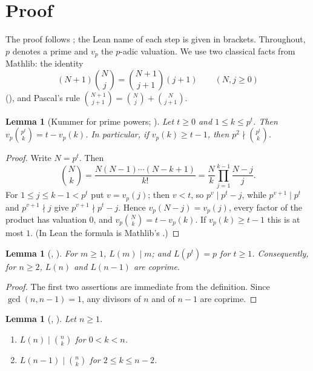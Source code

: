 \documentclass[11pt]{amsart}
\theoremstyle{plain}
\newtheorem{lemma}[theorem]{Lemma}
\theoremstyle{definition}
\begin{document}
\section{Proof}\label{sec:proof}

The proof follows ; the Lean name of each step is given in brackets. Throughout, $p$ denotes a prime and $v_p$ the $p$-adic valuation. We use two classical facts from Mathlib: the identity
\begin{equation}\label{eq:absorb}
  (N+1)\binom Nj=\binom{N+1}{j+1}(j+1)\qquad(N,j\ge0)
\end{equation}
(), and Pascal's rule $\binom{N+1}{j+1}=\binom Nj+\binom N{j+1}$.

\begin{lemma}[Kummer for prime powers; ]\label{lem:kummer}
Let $t\ge0$ and $1\le k\le p^t$. Then $v_p\binom{p^t}{k}=t-v_p(k)$. In particular, if $v_p(k)\ge t-1$, then $p^2\nmid\binom{p^t}k$.
\end{lemma}

\begin{proof}
Write $N=p^t$. Then
\[
  \binom Nk=\frac{N(N-1)\cdots(N-k+1)}{k!}=\frac Nk\prod_{j=1}^{k-1}\frac{N-j}{j}.
\]
For $1\le j\le k-1<p^t$ put $v=v_p(j)$; then $v<t$, so $p^v\mid p^t-j$, while $p^{v+1}\mid p^t$ and $p^{v+1}\nmid j$ give $p^{v+1}\nmid p^t-j$. Hence $v_p(N-j)=v_p(j)$, every factor of the product has valuation $0$, and $v_p\binom Nk=t-v_p(k)$. If $v_p(k)\ge t-1$ this is at most $1$. (In Lean the formula is Mathlib's .)
\end{proof}

\begin{lemma}[, ]\label{lem:L}
For $m\ge1$, $L(m)\mid m$; and $L(p^t)=p$ for $t\ge1$. Consequently, for $n\ge2$, $L(n)$ and $L(n-1)$ are coprime.
\end{lemma}

\begin{proof}
The first two assertions are immediate from the definition. Since $\gcd(n,n-1)=1$, any divisors of $n$ and of $n-1$ are coprime.
\end{proof}

\begin{lemma}[, ]\label{lem:lower}
Let $n\ge1$.
\begin{enumerate}
\item $L(n)\mid\binom nk$ for $0<k<n$.
\item $L(n-1)\mid\binom nk$ for $2\le k\le n-2$.
\end{enumerate}
\end{lemma}
\end{document}
